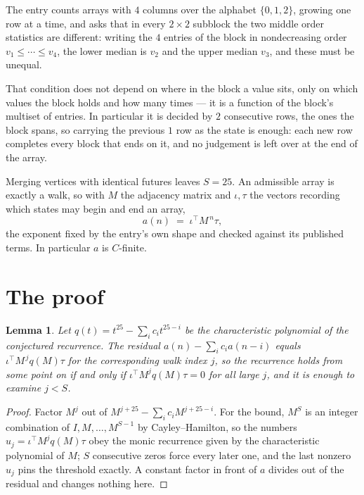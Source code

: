 \documentclass[11pt,a4paper]{article}
\theoremstyle{plain}
\newtheorem{lemma}[theorem]{Lemma}
\theoremstyle{definition}
\begin{document}
The entry counts arrays with $4$ columns over the alphabet $\{0,1,2\}$, growing one row at a time, and asks that in every $2\times2$ subblock the two middle order statistics are different: writing the $4$ entries of the block in nondecreasing order $v_1\le\cdots\le v_{4}$, the lower median is $v_{2}$ and the upper median $v_{3}$, and these must be unequal.

That condition does not depend on where in the block a value sits, only on which values the block holds and how many times --- it is a function of the block's multiset of entries. In particular it is decided by $2$ consecutive rows, the ones the block spans, so carrying the previous $1$ row as the state is enough: each new row completes every block that ends on it, and no judgement is left over at the end of the array.

Merging vertices with identical futures leaves $S=25$. An admissible array is exactly a walk, so with $M$ the adjacency matrix and $\iota,\tau$ the vectors recording which states may begin and end an array,
\[
a(n)\;=\;\iota^{\!\top}M^{\,n}\tau ,
\]
the exponent fixed by the entry's own shape and checked against its published terms. In
particular $a$ is $C$-finite.

\section{The proof}

\begin{lemma}\label{lem:crit}
Let $q(t)=t^{25}-\sum_i c_it^{25-i}$ be the characteristic polynomial of the
conjectured recurrence. The residual $a(n)-\sum_ic_ia(n-i)$ equals
$\iota^{\!\top}M^{\,j}q(M)\tau$ for the corresponding walk index $j$, so the recurrence
holds from some point on if and only if $\iota^{\!\top}M^{j}q(M)\tau=0$ for all large $j$,
and it is enough to examine $j<S$.
\end{lemma}

\begin{proof}
Factor $M^{j}$ out of $M^{j+25}-\sum_ic_iM^{j+25-i}$. For the bound, $M^{S}$
is an integer combination of $I,M,\dots,M^{S-1}$ by Cayley--Hamilton, so the numbers
$u_j=\iota^{\!\top}M^{j}q(M)\tau$ obey the monic recurrence given by the characteristic
polynomial of $M$; $S$ consecutive zeros force every later one, and the last nonzero $u_j$
pins the threshold exactly. A constant factor in front of $a$ divides out of the residual and
changes nothing here.
\end{proof}
\end{document}
